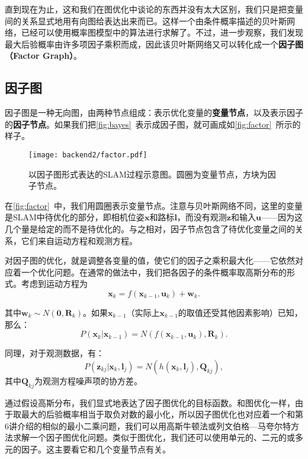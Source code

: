 直到现在为止，这和我们在图优化中谈论的东西并没有太大区别，我们只是把变量间的关系显式地用有向图给表达出来而已。这样一个由条件概率描述的贝叶斯网络，已经可以使用概率图模型中的算法进行求解了。不过，进一步观察，我们发现最大后验概率由许多项因子乘积而成，因此该贝叶斯网络又可以转化成一个\textbf{因子图（Factor Graph）}。

\subsection{因子图}
因子图是一种无向图，由两种节点组成：表示优化变量的\textbf{变量节点}，以及表示因子的\textbf{因子节点}。如果我们把\autoref{fig:bayes}~表示成因子图，就可画成如\autoref{fig:factor}~所示的样子。

\begin{figure}[!htp]
	\centering
	\texttt{[image: backend2/factor.pdf]}
	\caption{以因子图形式表达的SLAM过程示意图。圆圈为变量节点，方块为因子节点。}
	\label{fig:factor}
\end{figure}

在\autoref{fig:factor}~中，我们用圆圈表示变量节点。注意与贝叶斯网络不同，这里的变量是SLAM中待优化的部分，即相机位姿$\bm{x}$和路标$\bm{l}$，而没有观测$\bm{z}$和输入$\bm{u}$——因为这几个量是给定的而不是待优化的。与之相对，因子节点包含了待优化变量之间的关系，它们来自运动方程和观测方程。

对因子图的优化，就是调整各变量的值，使它们的因子之乘积最大化——它依然对应着一个优化问题。在通常的做法中，我们把各因子的条件概率取高斯分布的形式。考虑到运动方程为
\begin{equation}
{\bm{x}_k} = f\left( {{\bm{x}_{k - 1}},{\bm{u}_k}} \right) + {\bm{w}_k}.
\end{equation}

其中$\bm{w}_k \sim N(\bm{0}, \bm{R}_k)$。如果$\bm{x}_{k-1}$（实际上$\bm{x}_{k-1}$的取值还受其他因素影响）已知，那么：
\begin{equation}
P\left( {{\bm{x}_k}|{\bm{x}_{k - 1}}} \right) = N \left( {f\left( {{\bm{x}_{k - 1}},{\bm{u}_k}} \right),{\bm{R}_k}} \right).
\end{equation}

同理，对于观测数据，有：
\begin{equation}
P\left( {{\bm{z}_{kj}}|{\bm{x}_k},{\bm{l}_j}} \right) = N\left( {h\left( {{\bm{x}_k},{\bm{l}_j}} \right),{\bm{Q}_{kj}}} \right),
\end{equation}
其中$\bm{Q}_{kj}$为观测方程噪声项的协方差。

通过假设高斯分布，我们显式地表达了因子图优化的目标函数。和图优化一样，由于取最大的后验概率相当于取负对数的最小化，所以因子图优化也对应着一个和第6讲介绍的相似的最小二乘问题，我们可以用高斯牛顿法或列文伯格—马夸尔特方法求解一个因子图优化问题。类似于图优化，我们还可以使用单元的、二元的或多元的因子。这主要看它和几个变量节点有关。

